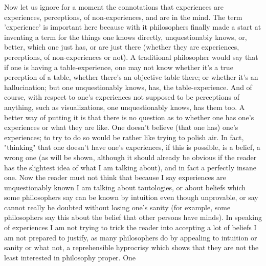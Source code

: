 \documentclass[10pt,twoside,draft]{memoir}
\begin{document}
Now let us ignore for a moment the connotations that experiences are 
experiences, perceptions, of non-experiences, and are in the mind. The term 
'experience' is important here because with it philosophers finally made a 
start at inventing a term for the things one knows directly, unquestionabiy 
knows, or, better, which one just has, or are just there (whether they are 
experiences, perceptions, of non-experiences or not). A traditional 
philosopher would say that if one is having a table-experience, one may not 
know whether it's a true perception of a table, whether there's an objective 
table there; or whether it's an hallucination; but one unquestionably knows, 
has, the table-experience. And of course, with respect to one's experiences 
not supposed to be perceptions of anything, such as visualizations, one 
unquestionably knows, has them too. A better way of putting it is that there 
is no question as to whether one has one's experiences or what they are like. 
One doesn't believe (that one has) one's experiences; to try to do so would 
be rather like trying to polish air. In fact, "thinking" that one doesn't have 
one's experiences, if this is possible, is a belief, a wrong one (as will be 
shown, although it should already be obvious if the reader has the slightest 
idea of what I am talking about), and in fact a perfectly insane one. Now the 
reader must not think that because I say experiences are unquestionably 
known I am talking about tautologies, or about beliefs which some 
philosophers say can be known by intuition even though unprovable, or say 
cannot really be doubted without losing one's sanity (for example, some 
philosophers say this about the belief that other persons have minds). In 
speaking of experiences I am not trying to trick the reader into accepting a 
lot of beliefs I am not prepared to justify, as many philosophers do by 
appealing to intuition or sanity or what not, a reprehensible hyprocrisy 
which shows that they are not the least interested in philosophy proper. One 
\end{document}
